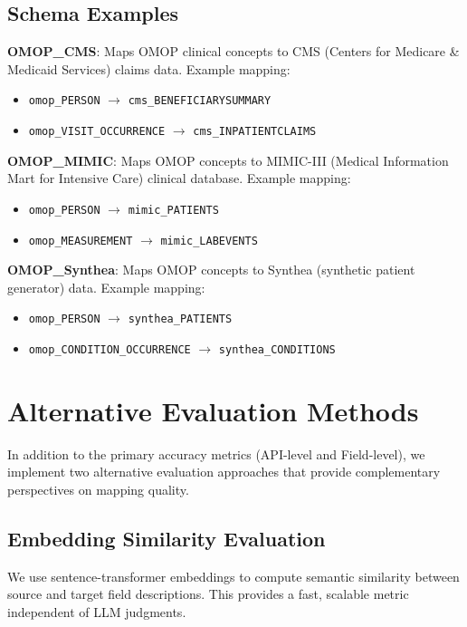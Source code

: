 \documentclass[sigconf, nonacm]{acmart}
\begin{document}
\subsection{Schema Examples}

\textbf{OMOP\_CMS}: Maps OMOP clinical concepts to CMS (Centers for Medicare \& Medicaid Services) claims data. Example mapping:
\begin{itemize}
    \item \texttt{omop\_PERSON} $\rightarrow$ \texttt{cms\_BENEFICIARYSUMMARY}
    \item \texttt{omop\_VISIT\_OCCURRENCE} $\rightarrow$ \texttt{cms\_INPATIENTCLAIMS}
\end{itemize}

\textbf{OMOP\_MIMIC}: Maps OMOP concepts to MIMIC-III (Medical Information Mart for Intensive Care) clinical database. Example mapping:
\begin{itemize}
    \item \texttt{omop\_PERSON} $\rightarrow$ \texttt{mimic\_PATIENTS}
    \item \texttt{omop\_MEASUREMENT} $\rightarrow$ \texttt{mimic\_LABEVENTS}
\end{itemize}

\textbf{OMOP\_Synthea}: Maps OMOP concepts to Synthea (synthetic patient generator) data. Example mapping:
\begin{itemize}
    \item \texttt{omop\_PERSON} $\rightarrow$ \texttt{synthea\_PATIENTS}
    \item \texttt{omop\_CONDITION\_OCCURRENCE} $\rightarrow$ \texttt{synthea\_CONDITIONS}
\end{itemize}

\section{Alternative Evaluation Methods}
\label{app:alt_eval}

In addition to the primary accuracy metrics (API-level and Field-level), we implement two alternative evaluation approaches that provide complementary perspectives on mapping quality.

\subsection{Embedding Similarity Evaluation}

We use sentence-transformer embeddings to compute semantic similarity between source and target field descriptions. This provides a fast, scalable metric independent of LLM judgments.
\end{document}
